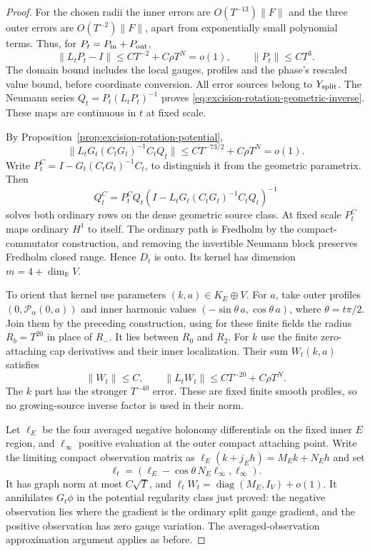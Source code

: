 \documentclass[11pt]{amsart}
\theoremstyle{definition}
\theoremstyle{remark}
\theoremstyle{plain}
\begin{document}
\begin{proof}
For the chosen radii the inner errors are
$O(T^{-13})\|F\|$ and the three outer errors
are $O(T^{-2})\|F\|$, apart from exponentially
small polynomial terms. Thus, for
$P_t=P_{\rm in}+P_{\rm out}$,
\[
 \|L_tP_t-I\|\leq CT^{-2}+C\rho T^N=o(1),
                         \qquad \|P_t\|\leq CT^3 .
\]
The domain bound includes the local gauges,
profiles and the phase's rescaled value
bound, before coordinate conversion.
All error sources belong to $Y_{\rm split}$.
The Neumann series $Q_t=P_t(L_tP_t)^{-1}$
proves \eqref{eq:excision-rotation-geometric-inverse}.
These maps are continuous in $t$ at fixed scale.

By Proposition~\ref{prop:excision-rotation-potential},
\[
 \|L_tG_t(C_tG_t)^{-1}C_tQ_t\|
                       \leq CT^{-73/2}+C\rho T^N=o(1).
\]
Write $P_t^C=I-G_t(C_tG_t)^{-1}C_t$, to
distinguish it from the geometric parametrix.
Then
\[
 Q_t^C=P_t^CQ_t
          (I-L_tG_t(C_tG_t)^{-1}C_tQ_t)^{-1}
\]
solves both ordinary rows on the dense
geometric source class. At fixed scale
$P_t^C$ maps ordinary $H^1$ to itself.
The ordinary path is Fredholm by the
compact-commutator construction, and removing
the invertible Neumann block preserves
Fredholm closed range. Hence $D_t$ is onto.
Its kernel has dimension $m=4+\dim_{\mathbb R}V$.

To orient that kernel use parameters
$(k,a)\in K_E\oplus V$.
For $a$, take outer profiles $(0,\mathcal P_\alpha(0,a))$
and inner harmonic values
$(-\sin\theta\,a,\cos\theta\,a)$,
where $\theta=t\pi/2$.
Join them by the preceding construction,
using for these finite fields the radius
$R_b=T^{20}$ in place of $R_-$.
It lies between $R_0$ and $R_2$.
For $k$ use the finite zero-attaching cap
derivatives and their inner localization.
Their sum $W_t(k,a)$ satisfies
\begin{equation}\label{eq:excision-rotation-finite-frame-error}
                    \|W_t\|\leq C,\qquad
               \|L_tW_t\|\leq CT^{-20}+C\rho T^N .
\end{equation}
The $k$ part has the stronger $T^{-40}$
error. These are fixed finite smooth
profiles, so no growing-source inverse
factor is used in their norm.

Let $\ell_E$ be the four averaged negative
holonomy differentials on the fixed inner
$E$ region, and $\ell_\infty$ positive
evaluation at the outer compact attaching
point. Write the limiting compact
observation matrix as
$\ell_E(k+j_Eh)=M_Ek+N_Eh$ and set
\[
       \ell_t=(\ell_E-\cos\theta\,N_E\ell_\infty,\ell_\infty).
\]
It has graph norm at most $C\sqrt T$, and
$\ell_tW_t=\operatorname{diag}(M_E,I_V)+o(1)$.
It annihilates $G_t\phi$ in the potential
regularity class just proved: the negative
observation lies where the gradient is the
ordinary split gauge gradient, and the
positive observation has zero gauge variation.
The averaged-observation approximation
argument applies as before.


\end{proof}
\end{document}
